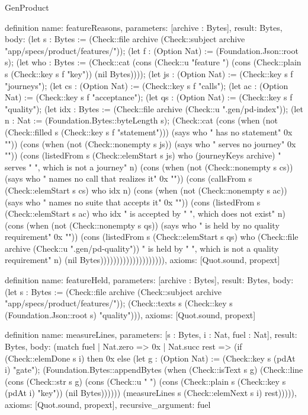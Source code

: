 \begin{lexlean}{GenProduct}
\begin{semanticmodule}
{definition{
  name: featureReasons,
  parameters: [archive : Bytes],
  result: Bytes,
  body: (let s : Bytes := (Check::file archive (Check::subject archive "app/specs/product/features/")); (let f : (Option Nat) := (Foundation.Json::root s); (let who : Bytes := (Check::cat (cons (Check::u "feature ") (cons (Check::plain s (Check::key s f "key")) (nil Bytes)))); (let js : (Option Nat) := (Check::key s f "journeys"); (let cs : (Option Nat) := (Check::key s f "calls"); (let ac : (Option Nat) := (Check::key s f "acceptance"); (let qs : (Option Nat) := (Check::key s f "quality"); (let idx : Bytes := (Check::file archive (Check::u ".gen/pd-index")); (let n : Nat := (Foundation.Bytes::byteLength s); (Check::cat (cons (when (not (Check::filled s (Check::key s f "statement"))) (says who " has no statement" 0x "")) (cons (when (not (Check::nonempty s js)) (says who " serves no journey" 0x "")) (cons (listedFrom s (Check::elemStart s js) who (journeyKeys archive) " serves " ", which is not a journey" n) (cons (when (not (Check::nonempty s cs)) (says who " names no call that realizes it" 0x "")) (cons (callsFrom s (Check::elemStart s cs) who idx n) (cons (when (not (Check::nonempty s ac)) (says who " names no suite that accepts it" 0x "")) (cons (listedFrom s (Check::elemStart s ac) who idx " is accepted by " ", which does not exist" n) (cons (when (not (Check::nonempty s qs)) (says who " is held by no quality requirement" 0x "")) (cons (listedFrom s (Check::elemStart s qs) who (Check::file archive (Check::u ".gen/pd-quality")) " is held by " ", which is not a quality requirement" n) (nil Bytes)))))))))))))))))))),
  axioms: [Quot.sound, propext]
}

definition{
  name: featureHeld,
  parameters: [archive : Bytes],
  result: Bytes,
  body: (let s : Bytes := (Check::file archive (Check::subject archive "app/specs/product/features/")); (Check::texts s (Check::key s (Foundation.Json::root s) "quality"))),
  axioms: [Quot.sound, propext]
}

definition{
  name: measureLines,
  parameters: [s : Bytes, i : Nat, fuel : Nat],
  result: Bytes,
  body: (match fuel
    | Nat.zero => 0x
    | Nat.succ rest => (if (Check::elemDone s i) then 0x else (let g : (Option Nat) := (Check::key s (pdAt i) "gate"); (Foundation.Bytes::appendBytes (when (Check::isText s g) (Check::line (cons (Check::str s g) (cons (Check::u " ") (cons (Check::plain s (Check::key s (pdAt i) "key")) (nil Bytes)))))) (measureLines s (Check::elemNext s i) rest))))),
  axioms: [Quot.sound, propext],
  recursive_argument: fuel
}

}
\end{semanticmodule}
\end{lexlean}
